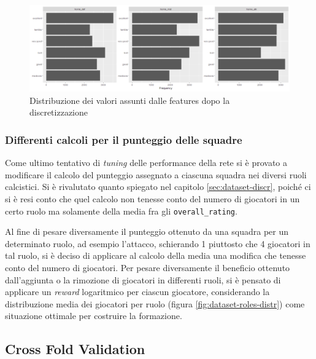 \documentclass[hidelinks, 12pt]{article}
\begin{document}
\begin{figure}[H]
	\centering
	\includegraphics[scale=0.45]{images/06_04_discr_distr.png}
	\caption[Distribuzione dei valori assunti dalle features dopo la discretizzazione]{Distribuzione dei valori assunti dalle features dopo la discretizzazione}
	\label{fig:perf-discr-distr}
\end{figure}


\subsubsection{Differenti calcoli per il punteggio delle squadre}

Come ultimo tentativo di \textit{tuning} delle performance della rete si è provato a modificare il calcolo del punteggio assegnato a ciascuna squadra nei diversi ruoli calcistici. Si è rivalutato quanto spiegato nel capitolo \ref{sec:dataset-discr}, poiché ci si è resi conto che quel calcolo non tenesse conto del numero di giocatori in un certo ruolo ma solamente della media fra gli \texttt{overall\_rating}.

Al fine di pesare diversamente il punteggio ottenuto da una squadra per un determinato ruolo, ad esempio l'attacco, schierando 1 piuttosto che 4 giocatori in tal ruolo, si è deciso di applicare al calcolo della media una modifica che tenesse conto del numero di giocatori. Per pesare diversamente il beneficio ottenuto dall'aggiunta o la rimozione di giocatori in differenti ruoli, si è pensato di applicare un \textit{reward} logaritmico per ciascun giocatore, considerando la distribuzione media dei giocatori per ruolo (figura \ref{fig:dataset-roles-distr}) come situazione ottimale per costruire la formazione.




\subsection{Cross Fold Validation}
\label{sec:perf-cross-fold}
\end{document}
